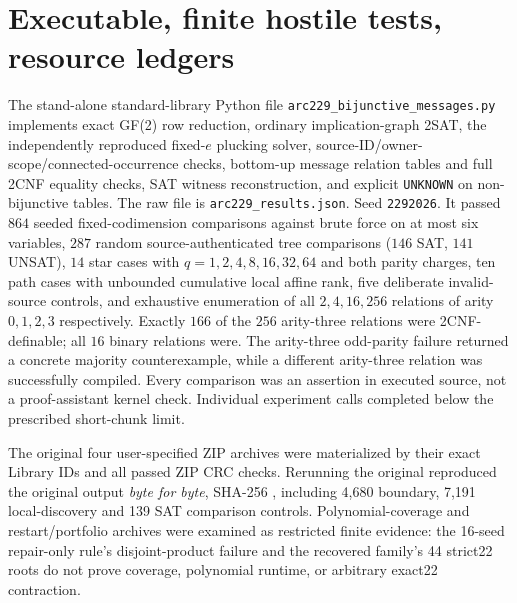 \documentclass[11pt]{article}
\begin{document}
\section{Executable, finite hostile tests, resource ledgers}
The stand-alone standard-library Python file \texttt{arc229\_bijunctive\_messages.py} implements exact GF(2) row reduction, ordinary implication-graph 2SAT, the independently reproduced fixed-$e$ plucking solver, source-ID/owner-scope/connected-occurrence checks, bottom-up message relation tables and full 2CNF equality checks, SAT witness reconstruction, and explicit \texttt{UNKNOWN} on non-bijunctive tables.  The raw file is \texttt{arc229\_results.json}.  Seed \texttt{2292026}.  It passed $864$ seeded fixed-codimension comparisons against brute force on at most six variables, $287$ random source-authenticated tree comparisons ($146$ SAT, $141$ UNSAT), $14$ star cases with $q=1,2,4,8,16,32,64$ and both parity charges, ten path cases with unbounded cumulative local affine rank, five deliberate invalid-source controls, and exhaustive enumeration of all $2,4,16,256$ relations of arity $0,1,2,3$ respectively.  Exactly $166$ of the $256$ arity-three relations were 2CNF-definable; all $16$ binary relations were.  The arity-three odd-parity failure returned a concrete majority counterexample, while a different arity-three relation was successfully compiled.  Every comparison was an assertion in executed source, not a proof-assistant kernel check.  Individual experiment calls completed below the prescribed short-chunk limit.

The original four user-specified ZIP archives were materialized by their exact Library IDs and all passed ZIP CRC checks.  Rerunning the original  reproduced the original output \emph{byte for byte}, SHA-256 \texttt{}, including 4,680 boundary, 7,191 local-discovery and 139 SAT comparison controls.  Polynomial-coverage and restart/portfolio archives were examined as restricted finite evidence: the 16-seed repair-only rule's disjoint-product failure and the recovered family's 44 strict22 roots do not prove coverage, polynomial runtime, or arbitrary exact22 contraction.
\end{document}
